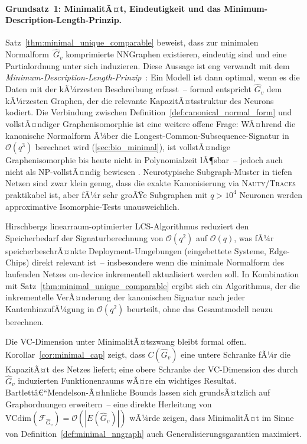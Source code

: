 ﻿\documentclass[12pt, a4paper, openany]{report}
\newcommand{\calF}{\mathcal{F}}
\begin{document}
\paragraph{Grundsatz~1: MinimalitÃ¤t, Eindeutigkeit und das Minimum-Description-Length-Prinzip.}
Satz~\ref{thm:minimal_unique_comparable} beweist, dass zur minimalen
Normal\-form~$\hat{G}_v$ komprimierte NNGraphen existieren, eindeutig sind
und eine Partialordnung unter sich induzieren.  Diese Aussage ist eng
verwandt mit dem
\emph{Minimum-Description-Length-Prinzip}~\cite{rissanen78}: Ein Modell ist
dann optimal, wenn es die Daten mit der kÃ¼rzesten Beschreibung erfasst~--
formal entspricht $\hat{G}_v$ dem kÃ¼rzesten Graphen, der die relevante
KapazitÃ¤ts\-struktur des Neurons kodiert.  Die Verbindung zwischen
Definition~\ref{def:canonical_normal_form} und vollstÃ¤ndiger
Graphenisomorphie ist eine weitere offene Frage: WÃ¤hrend die kanonische
Normalform Ã¼ber die Longest-Common-Subsequence-Signatur in $\mathcal{O}(q^3)$
berechnet wird (\cref{sec:bio_minimal}), ist vollstÃ¤ndige Graphenisomorphie
bis heute nicht in Polynomialzeit lÃ¶sbar~-- jedoch auch nicht als NP-vollstÃ¤ndig
bewiesen \cite{mckay14}.  Neurotypische Subgraph-Muster in tiefen Netzen sind
zwar klein genug, dass die exakte Kanonisierung via \textsc{Nauty}/\textsc{Traces}
\cite{mckay14} praktikabel ist, aber fÃ¼r sehr groÃŸe Subgraphen mit
$q > 10^4$ Neuronen werden approximative Isomorphie-Tests unausweichlich.

Hirschbergs linearraum-optimierter LCS-Algorithmus \cite{hirschberg75}
reduziert den Speicherbedarf der Signaturberechnung von $\mathcal{O}(q^2)$
auf $\mathcal{O}(q)$, was fÃ¼r speicherbeschrÃ¤nkte Deployment-Umgebungen
(eingebettete Systeme, Edge-Chips) direkt relevant ist~-- insbesondere wenn
die minimale Normalform des laufenden Netzes on-device inkrementell aktualisiert
werden soll.  In Kombination mit Satz~\ref{thm:minimal_unique_comparable}
ergibt sich ein Algorithmus, der die inkrementelle VerÃ¤nderung der
kanonischen Signatur nach jeder Kanten\-hin\-zu\-fÃ¼\-gung in
$\mathcal{O}(q^2)$ beurteilt, ohne das Gesamtmodell neuzu berechnen.

Die VC-Dimension unter MinimalitÃ¤tszwang bleibt formal offen.
Korollar~\ref{cor:minimal_cap} zeigt, dass $C(\hat{G}_v)$ eine untere
Schranke fÃ¼r die KapazitÃ¤t des Netzes liefert; eine obere Schranke der
VC-Dimension des durch $\hat{G}_v$ induzierten Funktionenraums wÃ¤re ein
wichtiges Resultat.  Bartlettâ€“Mendelson-Ã¤hnliche Bounds \cite{bartlett_mendelson02}
lassen sich grundsÃ¤tzlich auf Graphordnungen erweitern~-- eine direkte
Herleitung von $\text{VCdim}(\calF_{\hat{G}_v}) = \mathcal{O}(|E(\hat{G}_v)|)$
wÃ¼rde zeigen, dass MinimalitÃ¤t im Sinne von Definition~\ref{def:minimal_nngraph}
auch Generalisierungsgarantien maximiert.
\end{document}
